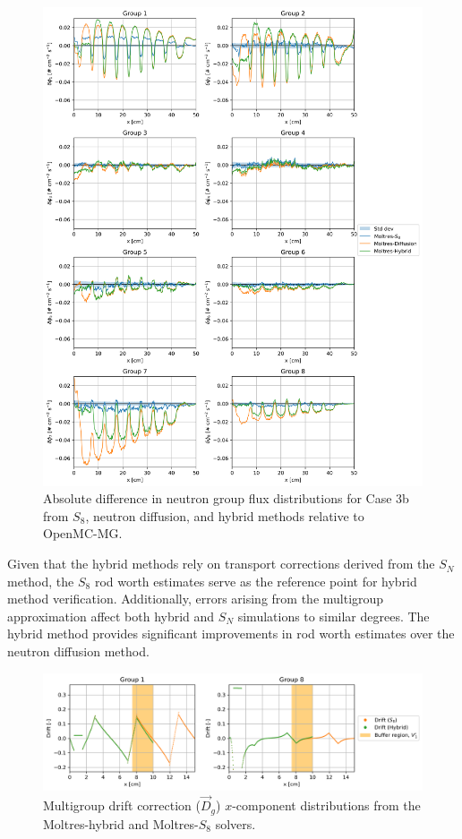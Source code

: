 \documentclass[letterpaper]{mc2025}
\begin{document}
\begin{figure}[p]
  \centering
  \includegraphics[width=0.98\columnwidth]{case-3b-flux-diff}
  \caption{Absolute difference in neutron group flux distributions for Case 3b from $S_8$,
  neutron diffusion, and hybrid methods relative to OpenMC-MG.}
  \label{fig:3b-flux-diff}
\end{figure}

Given that the hybrid methods rely on transport corrections derived from the $S_N$ method, the
$S_8$ rod worth estimates serve as the
reference point for hybrid method verification. Additionally, errors arising from the multigroup
approximation affect both hybrid and $S_N$ simulations to similar degrees. The hybrid method
provides significant improvements in rod worth estimates over the neutron diffusion method.
%
\begin{figure}[t]
  \centering
  \includegraphics[width=\columnwidth]{case-3b-drift}
  \caption{Multigroup drift correction ($\vec{D}_g$) $x$-component distributions from the
  Moltres-hybrid and Moltres-$S_8$ solvers.}
  \label{fig:3b-drift}
\end{figure}
\end{document}
